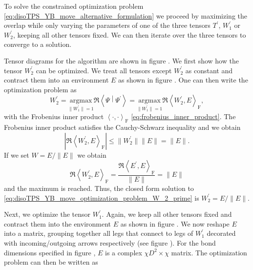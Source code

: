 To solve the constrained optimization problem \eqref{eq:disoTPS_YB_move_alternative_formulation} we proceed by maximizing the overlap while only varying the parameters of one of the three tensors $T^\prime$, $W_1^\prime$ or $W_2^\prime$, keeping all other tensors fixed. We can then iterate over the three tensors to converge to a solution. \par
Tensor diagrams for the algorithm are shown in figure . We first show how the tensor $W_2^\prime$ can be optimized. We treat all tensors except $W_2^\prime$ as constant and contract them into an environment $E$ as shown in figure . One can then write the optimization problem as
\begin{equation}
	\label{eq:disoTPS_YB_move_optimization_problem_W_2_prime}
	W_2^\prime = \underset{\lVert W_1^\prime \rVert = 1}{\text{argmax}} \Re\left\langle\Psi\middle|\Psi^\prime\right\rangle = \underset{\lVert W_1^\prime \rVert = 1}{\text{argmax}} \Re\left\langle W_2^\prime, E \right\rangle_\text{F},
\end{equation}
with the Frobenius inner product $\left\langle \cdot, \cdot \right\rangle_\text{F}$ \eqref{eq:frobenius_inner_product}. The Frobenius inner product satisfies the Cauchy-Schwarz inequality and we obtain
\begin{equation}
	\left|\Re\left\langle W_2^\prime, E \right\rangle_\text{F}\right| \le \lVert W_2^\prime\rVert\lVert E\rVert = \lVert E\rVert.
\end{equation}
If we set $W = E/\lVert E\rVert$ we obtain
\begin{equation}
	\Re\left\langle W_2^\prime, E \right\rangle_\text{F} = \frac{\Re\left\langle E^\prime, E \right\rangle_\text{F}}{\lVert E\rVert} = \lVert E\rVert
\end{equation}
and the maximum is reached. Thus, the closed form solution to \eqref{eq:disoTPS_YB_move_optimization_problem_W_2_prime} is $W_2^\prime = E/\lVert E\rVert$. \par
Next, we optimize the tensor $W_1^\prime$. Again, we keep all other tensors fixed and contract them into the environment $E$ as shown in figure . We now reshape $E$ into a matrix, grouping together all legs that connect to legs of $W_1^\prime$ decorated with incoming/outgoing arrows respectively (see figure ). For the bond dimensions specified in figure , $E$ is a complex $\chi D^2 \times \chi$ matrix. The optimization problem can then be written as
